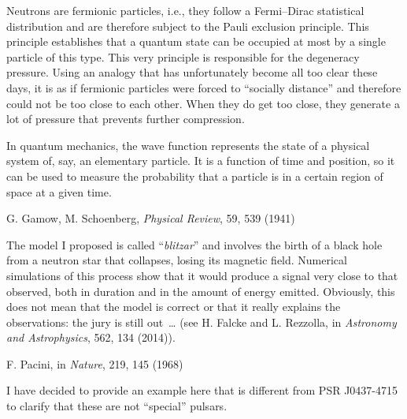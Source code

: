 \begin{description}[style=multiline,leftmargin=2em,labelwidth=1.5em]
\item[9.]\hypertarget{note:05-09}{}Neutrons are fermionic particles, i.e., they follow a Fermi--Dirac statistical
distribution and are therefore subject to the Pauli exclusion principle. This principle
establishes that a quantum state can be occupied at most by a single particle of this
type. This very principle is responsible for the degeneracy pressure.
Using an analogy that has unfortunately become all too clear these days, it is as if
fermionic particles were forced to ``socially distance'' and therefore could not be too
close to each other. When they do get too close, they generate a lot of pressure that
prevents further compression.

\item[10.]\hypertarget{note:05-10}{}In quantum mechanics, the wave function represents the state of a
physical system of, say, an elementary particle. It is a function of time and position,
so it can be used to measure the probability that a particle is in a certain region of
space at a given time.

\item[11.]\hypertarget{note:05-11}{}G. Gamow, M. Schoenberg, \emph{Physical Review}, 59, 539 (1941)

\item[12.]\hypertarget{note:05-12}{}The model I proposed is called ``\emph{blitzar}'' and involves the birth of a black
hole from a neutron star that collapses, losing its magnetic field. Numerical
simulations of this process show that it would produce a signal very close to that
observed, both in duration and in the amount of energy emitted. Obviously, this does not
mean that the model is correct or that it really explains the observations: the jury is
still out~\ldots{} (see H. Falcke and L. Rezzolla, in \emph{Astronomy and Astrophysics},
562, 134 (2014)).

\item[13.]\hypertarget{note:05-13}{}F. Pacini, in \emph{Nature}, 219, 145 (1968)

\item[14.]\hypertarget{note:05-14}{}I have decided to provide an example here that is different from PSR J0437-4715 to
clarify that these are not ``special'' pulsars.

\end{description}
